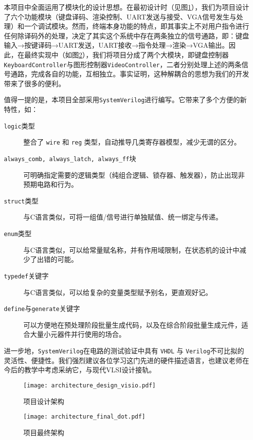 
本项目中全面运用了模块化的设计思想。在最初设计时（见图\ref{fig:design_architecture}），我们为项目设计了六个功能模块（键盘译码、渲染控制、UART发送与接受、VGA信号发生与处理）和一个调试模块。然而，终端本身功能的特点，即其事实上不对用户指令进行任何除译码外的处理，决定了其实这个系统中存在两条独立的信号通路，即：键盘输入→按键译码→UART发送，UART接收→指令处理→渲染→VGA输出。因此，在最终实现中（如图\ref{fig:final_architecture}），我们将项目分成了两个大模块，即键盘控制器\texttt{KeyboardController}与图形控制器\texttt{VideoController}，二者分别处理上述的两条信号通路，完成各自的功能，互相独立。事实证明，这种解耦合的思想为我们的开发带来了很多的便利。

值得一提的是，本项目全部采用\texttt{SystemVerilog}进行编写。它带来了多个方便的新特性，如：
\begin{description}
  \item[\texttt{logic}类型] 整合了 \texttt{wire} 和 \texttt{reg} 类型，自动推导几类寄存器模型，减少无谓的区分。
  \item[\texttt{always\_comb, always\_latch, always\_ff}块] 可明确指定需要的逻辑类型（纯组合逻辑、锁存器、触发器），防止出现非预期电路和行为。
  \item[\texttt{struct}类型] 与C语言类似，可将一组值/信号进行单独赋值、统一绑定与传递。
  \item[\texttt{enum}类型] 与C语言类似，可以给常量赋名称，并有作用域限制，在状态机的设计中减少了出错的可能。
  \item[\texttt{typedef}关键字] 与C语言类似，可以给复杂的变量类型赋予别名，更直观好记。
  \item[\texttt{define}与\texttt{generate}关键字] 可以方便地在预处理阶段批量生成代码，以及在综合阶段批量生成元件，适合大量小元器件并行使用的场合。
\end{description}

进一步地，\texttt{SystemVerilog}在电路的测试验证中具有 \texttt{VHDL} 与 \texttt{Verilog}不可比拟的灵活性、便捷性。我们强烈建议各位学习这门先进的硬件描述语言，也建议老师在今后的教学中考虑采纳它，与现代VLSI设计接轨。

\begin{figure}[htbp]
\centerline{
\texttt{[image: architecture\_design\_visio.pdf]}
}
\label{fig:design_architecture}
\caption{项目设计架构}
\end{figure}

\begin{figure}[htbp]
\centerline{
\texttt{[image: architecture\_final\_dot.pdf]}
}
\label{fig:final_architecture}
\caption{项目最终架构}
\end{figure}